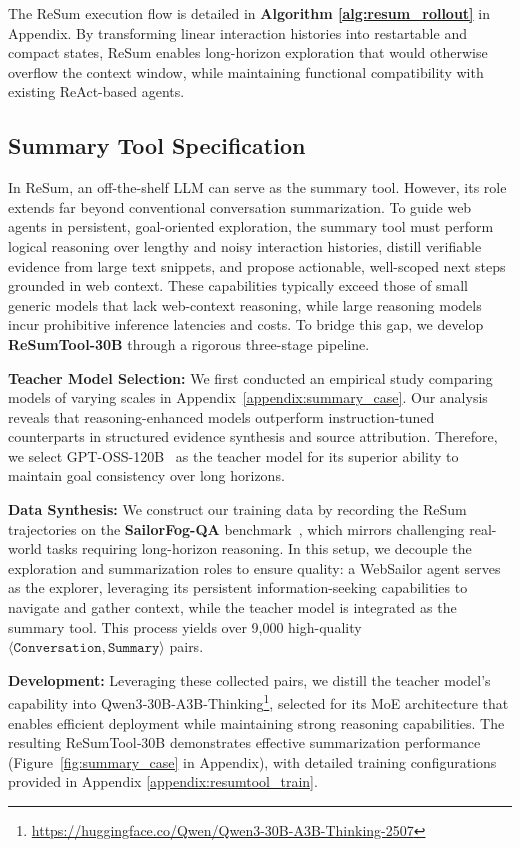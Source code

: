 The ReSum execution flow is detailed in \textbf{Algorithm \ref{alg:resum_rollout}} in Appendix. By transforming linear interaction histories into restartable and compact states, ReSum enables long-horizon exploration that would otherwise overflow the context window, while maintaining functional compatibility with existing ReAct-based agents.


\subsection{Summary Tool Specification}

In ReSum, an off-the-shelf LLM can serve as the summary tool. However, its role extends far beyond conventional conversation summarization. To guide web agents in persistent, goal-oriented exploration, the summary tool must perform logical reasoning over lengthy and noisy interaction histories, distill verifiable evidence from large text snippets, and propose actionable, well-scoped next steps grounded in web context. These capabilities typically exceed those of small generic models that lack web-context reasoning, while large reasoning models incur prohibitive inference latencies and costs. To bridge this gap, we develop \textbf{ReSumTool-30B} through a rigorous three-stage pipeline.

\textbf{Teacher Model Selection:} We first conducted an empirical study comparing models of varying scales in Appendix~\ref{appendix:summary_case}. Our analysis reveals that reasoning-enhanced models outperform instruction-tuned counterparts in structured evidence synthesis and source attribution. Therefore, we select GPT-OSS-120B~\citep{gpt-oss} as the teacher model for its superior ability to maintain goal consistency over long horizons.

\textbf{Data Synthesis:} We construct our training data by recording the ReSum trajectories on the \textbf{SailorFog-QA} benchmark~\citep{li2025websailor}, which mirrors challenging real-world tasks requiring long-horizon reasoning. In this setup, we decouple the exploration and summarization roles to ensure quality: a WebSailor agent serves as the explorer, leveraging its persistent information-seeking capabilities to navigate and gather context, while the teacher model is integrated as the summary tool. This process yields over 9,000 high-quality $\langle \texttt{Conversation}, \texttt{Summary} \rangle$ pairs. 

\textbf{Development:} Leveraging these collected pairs, we distill the teacher model's capability into Qwen3‑30B-A3B-Thinking\footnote{\href{https://huggingface.co/Qwen/Qwen3-30B-A3B-Thinking-2507}{https://huggingface.co/Qwen/Qwen3-30B-A3B-Thinking-2507}}, selected for its MoE architecture that enables efficient deployment while maintaining strong reasoning capabilities. The resulting ReSumTool‑30B demonstrates effective summarization performance (Figure~\ref{fig:summary_case} in Appendix), with detailed training configurations provided in Appendix \ref{appendix:resumtool_train}.


